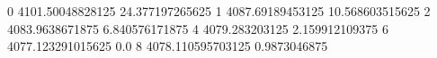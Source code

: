 0 4101.50048828125 24.377197265625
1 4087.69189453125 10.568603515625
2 4083.9638671875 6.840576171875
4 4079.283203125 2.159912109375
6 4077.123291015625 0.0
8 4078.110595703125 0.9873046875
